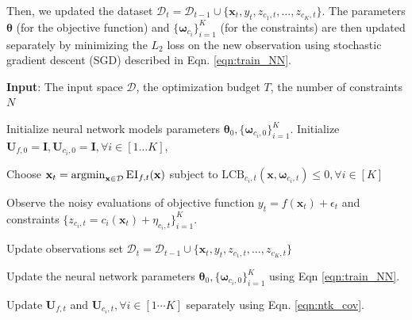 Then, we updated the dataset $\mathcal{D}_t = \mathcal{D}_{t-1} \cup \{\mathbf{x}_t, y_t, z_{c_1,t}, \dots, z_{{c_K}, t}\}$. The parameters $\boldsymbol{\theta}$ (for the objective function) and $\{ \boldsymbol{\omega}_{c_i} \}_{i=1}^K$ (for the constraints) are then updated separately by minimizing the $L_2$ loss on the new observation using stochastic gradient descent (SGD) described in Eqn. \ref{eqn:train_NN}.

\begin{algorithm}[!ht]
\caption{}
\label{alg:neural_cbo}
\textbf{Input}: The input space $\mathcal D$, the optimization budget $T$, the number of constraints $N$
\begin{algorithmic}[1]
\State Initialize neural network models parameters $\boldsymbol{\theta}_0, \{ \boldsymbol{\omega}_{c_i,0} \}_{i=1}^K$.
\State Initialize $\mathbf{U}_{f,0} =   \mathbf{I}, \mathbf{U}_{c_i,0} =   \mathbf{I}, \forall i \in [1 \dots K]$,  

\State \parbox[t]{\dimexpr\linewidth-\algorithmicindent}{%
 Choose $\mathbf{x}_t = \operatorname*{argmin}_{\mathbf{x} \in \mathcal{D}} \textsc{EI}_{f,t}(\mathbf{x}) $ subject to $\text{LCB}_{c_i,t}(\mathbf{x}, \boldsymbol{\omega}_{c_i,t}) \le 0, \forall i \in [K]$ \label{alg:line_lcb_ei}
}
\State \parbox[t]{\dimexpr\linewidth-\algorithmicindent}{%
 Observe the noisy evaluations of objective function $y_t = f(\mathbf{x}_t) + \epsilon_t$ and constraints $\{ z_{c_i,t} = c_i(\mathbf{x}_t) + \eta_{c_i,t} \}_{i=1}^K$.
}
\State \parbox[t]{\dimexpr\linewidth-\algorithmicindent}{%
 Update observations set $\mathcal{D}_t = \mathcal{D}_{t-1} \cup \{\mathbf{x}_t, y_t, z_{c_1,t}, \dots, z_{{c_K}, t}\}$
}
\State \parbox[t]{\dimexpr\linewidth-\algorithmicindent}{%
 Update the neural network parameters $\boldsymbol{\theta}_0, \{ \boldsymbol{\omega}_{c_i,0} \}_{i=1}^K$ using Eqn \ref{eqn:train_NN}.
}
\State \parbox[t]{\dimexpr\linewidth-\algorithmicindent}{%
 Update $\mathbf{U}_{f,t}$ and $\mathbf{U}_{c_i,t}, \forall i \in [1 \cdots K]$ separately using Eqn. \ref{eqn:ntk_cov}.
}
\EndFor


\end{algorithmic}
\end{algorithm}




